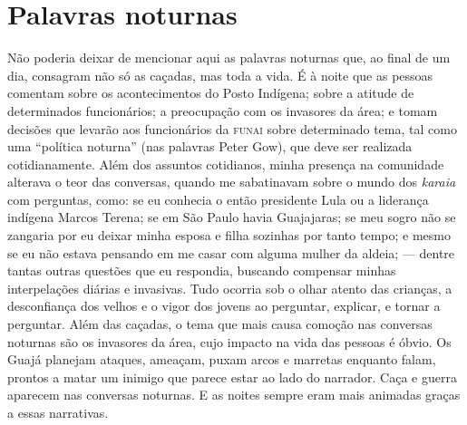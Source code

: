 \section{Palavras noturnas}

Não poderia deixar de mencionar aqui as palavras noturnas que, ao final
de um dia, consagram não só as caçadas, mas toda a vida. É à noite que
as pessoas comentam sobre os acontecimentos do Posto Indígena; sobre a
atitude de determinados funcionários; a preocupação com os invasores da
área; e tomam decisões que levarão aos funcionários da \textsc{funai} sobre
determinado tema, tal como uma ``política noturna'' (nas palavras Peter
Gow), que deve ser realizada cotidianamente. Além dos assuntos
cotidianos, minha presença na comunidade alterava o teor das conversas,
quando me sabatinavam sobre o mundo dos \emph{karaia} com perguntas,
como: se eu conhecia o então presidente Lula ou a liderança indígena
Marcos Terena; se em São Paulo havia Guajajaras; se meu sogro não se
zangaria por eu deixar minha esposa e filha sozinhas por tanto tempo; e
mesmo se eu não estava pensando em me casar com alguma mulher da aldeia;
--- dentre tantas outras questões que eu respondia, buscando compensar
minhas interpelações diárias e invasivas. Tudo ocorria sob o olhar
atento das crianças, a desconfiança dos velhos e o vigor dos jovens ao
perguntar, explicar, e tornar a perguntar. Além das caçadas, o tema que
mais causa comoção nas conversas noturnas são os invasores da área, cujo
impacto na vida das pessoas é óbvio. Os Guajá planejam ataques, ameaçam,
puxam arcos e marretas enquanto falam, prontos a matar um inimigo que
parece estar ao lado do narrador. Caça e guerra aparecem nas conversas
noturnas. E as noites sempre eram mais animadas graças a essas
narrativas.

